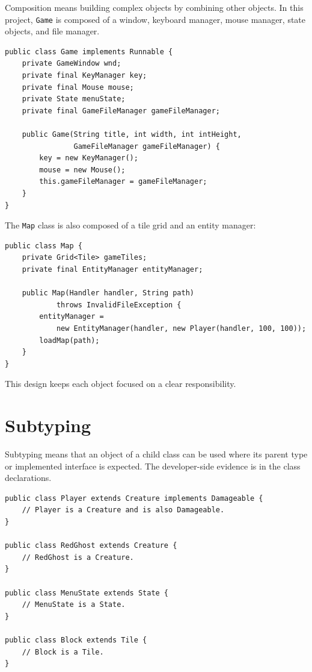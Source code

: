 \documentclass[12pt,a4paper]{article}
\begin{document}
Composition means building complex objects by combining other objects. In this project, \texttt{Game} is composed of a window, keyboard manager, mouse manager, state objects, and file manager.

\begin{lstlisting}
public class Game implements Runnable {
    private GameWindow wnd;
    private final KeyManager key;
    private final Mouse mouse;
    private State menuState;
    private final GameFileManager gameFileManager;

    public Game(String title, int width, int intHeight,
                GameFileManager gameFileManager) {
        key = new KeyManager();
        mouse = new Mouse();
        this.gameFileManager = gameFileManager;
    }
}
\end{lstlisting}

The \texttt{Map} class is also composed of a tile grid and an entity manager:

\begin{lstlisting}
public class Map {
    private Grid<Tile> gameTiles;
    private final EntityManager entityManager;

    public Map(Handler handler, String path)
            throws InvalidFileException {
        entityManager =
            new EntityManager(handler, new Player(handler, 100, 100));
        loadMap(path);
    }
}
\end{lstlisting}

This design keeps each object focused on a clear responsibility.

\section{Subtyping}

Subtyping means that an object of a child class can be used where its parent type or implemented interface is expected. The developer-side evidence is in the class declarations.

\begin{lstlisting}
public class Player extends Creature implements Damageable {
    // Player is a Creature and is also Damageable.
}

public class RedGhost extends Creature {
    // RedGhost is a Creature.
}

public class MenuState extends State {
    // MenuState is a State.
}

public class Block extends Tile {
    // Block is a Tile.
}
\end{lstlisting}
\end{document}
